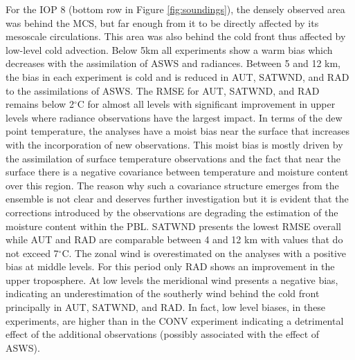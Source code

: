 \documentclass[final,5p,times,twocolumn,authoryear]{elsarticle} %
\begin{document}
For the IOP 8 (bottom row in Figure \ref{fig:soundings}), the densely observed area was behind the MCS, but far enough from it to be directly affected by its mesoscale circulations. This area was also behind the cold front thus affected by low-level cold advection. Below 5km all experiments show a warm bias which decreases with the assimilation of ASWS and radiances. Between 5 and 12 km, the bias in each experiment is cold and is reduced in AUT, SATWND, and RAD to the assimilations of ASWS. The RMSE for AUT, SATWND, and RAD remains below 2\(^{\circ}\)C for almost all levels with significant improvement in upper levels where radiance observations have the largest impact. In terms of the dew point temperature, the analyses have a moist bias near the surface that increases with the incorporation of new observations. This moist bias is mostly driven by the assimilation of surface temperature observations and the fact that near the surface there is a negative covariance between temperature and moisture content over this region. The reason why such a covariance structure emerges from the ensemble is not clear and deserves further investigation but it is evident that the corrections introduced by the observations are degrading the estimation of the moisture content within the PBL. SATWND presents the lowest RMSE overall while AUT and RAD are comparable between 4 and 12 km with values that do not exceed 7\(^{\circ}\)C. The zonal wind is overestimated on the analyses with a positive bias at middle levels. For this period only RAD shows an improvement in the upper troposphere. At low levels the meridional wind presents a negative bias, indicating an underestimation of the southerly wind behind the cold front principally in AUT, SATWND, and RAD. In fact, low level biases, in these experiments, are higher than in the CONV experiment indicating a detrimental effect of the additional observations (possibly associated with the effect of ASWS).
\end{document}
